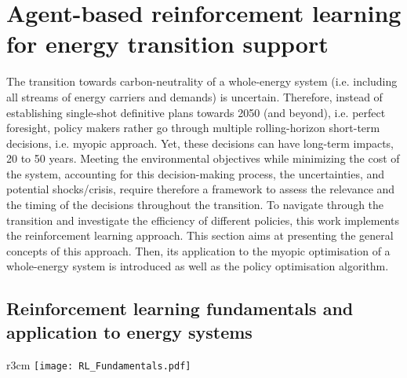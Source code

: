 \section{Agent-based reinforcement learning for energy transition support}
\label{sec:meth:RL}


The transition towards carbon-neutrality of a whole-energy system (i.e. including all streams of energy carriers and demands) is uncertain. Therefore, instead of establishing single-shot definitive plans towards 2050 (and beyond), i.e. perfect foresight, policy makers rather go through multiple rolling-horizon short-term decisions, i.e. myopic approach. Yet, these decisions can have long-term impacts, 20 to 50 years. Meeting the environmental objectives while minimizing the cost of the system, accounting for this decision-making process, the uncertainties, and potential shocks/crisis, require therefore a framework to assess the relevance and the timing of the decisions throughout the transition. To navigate through the transition and investigate the efficiency of different policies, this work implements the reinforcement learning approach. This section aims at presenting the general concepts of this approach. Then, its application to the myopic optimisation of a whole-energy system is introduced as well as the policy optimisation algorithm. 

\subsection{Reinforcement learning fundamentals and application to energy systems}
\label{subsec:meth_RL_fundamentals}

\begin{wrapfigure}{r}{3cm}
\centering
\captionsetup{justification=centering}
\texttt{[image: RL\_Fundamentals.pdf]}
\caption{}
\label{fig:RL_Fundamentals}
\end{wrapfigure}

